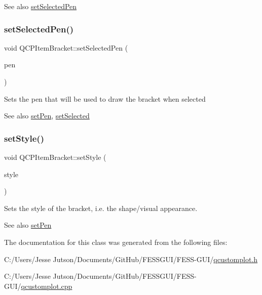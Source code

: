 \begin{DoxySeeAlso}{See also}
\hyperlink{class_q_c_p_item_bracket_a349785c31122778a520c64891fa204c5}{set\+Selected\+Pen} 
\end{DoxySeeAlso}
\hypertarget{class_q_c_p_item_bracket_a349785c31122778a520c64891fa204c5}{}\label{class_q_c_p_item_bracket_a349785c31122778a520c64891fa204c5} 
\subsubsection{\texorpdfstring{set\+Selected\+Pen()}{setSelectedPen()}}
{\footnotesize\ttfamily void Q\+C\+P\+Item\+Bracket\+::set\+Selected\+Pen (\begin{DoxyParamCaption}\item[{const Q\+Pen \&}]{pen }\end{DoxyParamCaption})}

Sets the pen that will be used to draw the bracket when selected

\begin{DoxySeeAlso}{See also}
\hyperlink{class_q_c_p_item_bracket_ab13001d9cc5d8f9e56ea15bdda682acb}{set\+Pen}, \hyperlink{class_q_c_p_abstract_item_a203de94ad586cc44d16c9565f49d3378}{set\+Selected} 
\end{DoxySeeAlso}
\hypertarget{class_q_c_p_item_bracket_a612dffa2373422eef8754d690add3703}{}\label{class_q_c_p_item_bracket_a612dffa2373422eef8754d690add3703} 
\subsubsection{\texorpdfstring{set\+Style()}{setStyle()}}
{\footnotesize\ttfamily void Q\+C\+P\+Item\+Bracket\+::set\+Style (\begin{DoxyParamCaption}\item[{\hyperlink{class_q_c_p_item_bracket_a7ac3afd0b24a607054e7212047d59dbd}{Q\+C\+P\+Item\+Bracket\+::\+Bracket\+Style}}]{style }\end{DoxyParamCaption})}

Sets the style of the bracket, i.\+e. the shape/visual appearance.

\begin{DoxySeeAlso}{See also}
\hyperlink{class_q_c_p_item_bracket_ab13001d9cc5d8f9e56ea15bdda682acb}{set\+Pen} 
\end{DoxySeeAlso}


The documentation for this class was generated from the following files\+:\begin{DoxyCompactItemize}
\item 
C\+:/\+Users/\+Jesse Jutson/\+Documents/\+Git\+Hub/\+F\+E\+S\+S\+G\+U\+I/\+F\+E\+S\+S-\/\+G\+U\+I/\hyperlink{qcustomplot_8h}{qcustomplot.\+h}\item 
C\+:/\+Users/\+Jesse Jutson/\+Documents/\+Git\+Hub/\+F\+E\+S\+S\+G\+U\+I/\+F\+E\+S\+S-\/\+G\+U\+I/\hyperlink{qcustomplot_8cpp}{qcustomplot.\+cpp}\end{DoxyCompactItemize}
